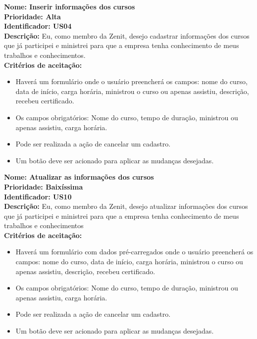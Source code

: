 \begin{anexosenv}
\indent \textbf{Nome: Inserir informações dos cursos\\
    \indent Prioridade: Alta\\
    \indent Identificador: US04\\
    \indent Descrição:} Eu, como membro da Zenit, desejo cadastrar informações dos cursos que já participei e ministrei para que a empresa tenha conhecimento de meus trabalhos e conhecimentos.\\
\indent \textbf{Critérios de aceitação:}
\begin{itemize}
    \item Haverá um formulário onde o usuário preencherá os campos: nome do curso, data de início, carga horária, ministrou o curso ou apenas assistiu, descrição, recebeu certificado.
    \item Os campos obrigatórios: Nome do curso, tempo de duração, ministrou ou apenas assistiu, carga horária.
    \item Pode ser realizada a ação de cancelar um cadastro.
    \item Um botão deve ser acionado para aplicar as mudanças desejadas.
\end{itemize}

\indent \textbf{Nome: Atualizar as informações dos cursos\\
    \indent Prioridade:  Baixíssima\\
    \indent Identificador: US10\\
    \indent Descrição:} Eu, como membro da Zenit, desejo atualizar informações dos cursos que já participei e ministrei para que a empresa tenha conhecimento de meus trabalhos e conhecimentos\\
\indent \textbf{Critérios de aceitação:}
\begin{itemize}
    \item Haverá um formulário com dados pré-carregados onde o usuário preencherá os campos: nome do curso, data de início, carga horária, ministrou o curso ou apenas assistiu, descrição, recebeu certificado.
    \item Os campos obrigatórios: Nome do curso, tempo de duração, ministrou ou apenas assistiu, carga horária.
    \item Pode ser realizada a ação de cancelar um cadastro.
    \item Um botão deve ser acionado para aplicar as mudanças desejadas.
\end{itemize}


\end{anexosenv}
